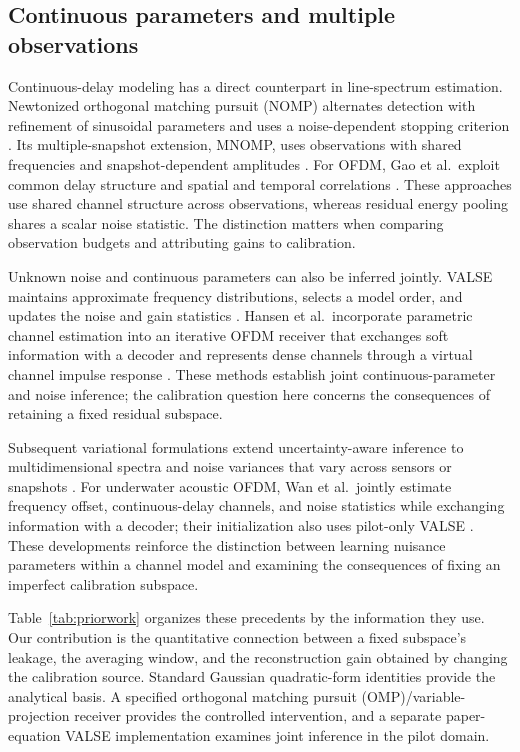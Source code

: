 \subsection{Continuous parameters and multiple observations}
Continuous-delay modeling has a direct counterpart in line-spectrum
estimation. Newtonized orthogonal matching pursuit (NOMP) alternates detection
with refinement of sinusoidal parameters and uses a noise-dependent stopping
criterion \cite{mamandipoor2016nomp}. Its multiple-snapshot extension, MNOMP,
uses observations with shared frequencies and snapshot-dependent amplitudes
\cite{zhu2019mnomp}. For OFDM, Gao et al.\ exploit common delay structure and
spatial and temporal correlations \cite{gao2014superresolution}. These
approaches use shared channel structure across observations, whereas residual
energy pooling shares a scalar noise statistic. The distinction matters when
comparing observation budgets and attributing gains to calibration.

Unknown noise and continuous parameters can also be inferred jointly. VALSE
maintains approximate frequency distributions, selects a model order, and
updates the noise and gain statistics \cite{badiu2017valse}. Hansen et al.\
incorporate parametric channel estimation into an iterative OFDM receiver that
exchanges soft information with a decoder and represents dense channels through
a virtual channel impulse response \cite{hansen2018iterative}. These methods
establish joint continuous-parameter and noise inference; the calibration
question here concerns the consequences of retaining a fixed residual subspace.

Subsequent variational formulations extend uncertainty-aware inference to
multidimensional spectra \cite{zhang2020mdvalse} and noise variances that vary
across sensors or snapshots \cite{zhang2021heteroscedastic}. For underwater
acoustic OFDM, Wan et al.\ jointly estimate frequency offset, continuous-delay
channels, and noise statistics while exchanging information with a decoder;
their initialization also uses pilot-only VALSE \cite{wan2022jccdvalse}.
These developments reinforce the distinction between learning nuisance
parameters within a channel model and examining the consequences of fixing an
imperfect calibration subspace.

Table~\ref{tab:priorwork} organizes these precedents by the information they
use. Our contribution is the quantitative connection between a fixed
subspace's leakage, the averaging window, and the reconstruction gain obtained
by changing the calibration source. Standard Gaussian quadratic-form identities
provide the analytical basis. A specified orthogonal matching pursuit
(OMP)/variable-projection receiver provides the controlled intervention, and
a separate paper-equation VALSE implementation examines joint inference in
the pilot domain.

